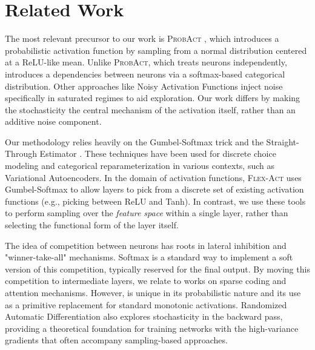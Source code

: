 \section{Related Work}

The most relevant precursor to our work is \textsc{ProbAct} \cite{probact2019}, which introduces a probabilistic activation function by sampling from a normal distribution centered at a ReLU-like mean. Unlike \textsc{ProbAct}, which treats neurons independently, \methodname introduces a dependencies between neurons via a softmax-based categorical distribution. Other approaches like Noisy Activation Functions \cite{noisyact2016} inject noise specifically in saturated regimes to aid exploration. Our work differs by making the stochasticity the central mechanism of the activation itself, rather than an additive noise component.

Our methodology relies heavily on the Gumbel-Softmax trick \cite{gumbel1998} and the Straight-Through Estimator \cite{straightthrough2013}. These techniques have been used for discrete choice modeling and categorical reparameterization in various contexts, such as Variational Autoencoders. In the domain of activation functions, \textsc{Flex-Act} \cite{flexact2026} uses Gumbel-Softmax to allow layers to pick from a discrete set of existing activation functions (e.g., picking between ReLU and Tanh). In contrast, we use these tools to perform sampling over the {\it feature space} within a single layer, rather than selecting the functional form of the layer itself.

The idea of competition between neurons has roots in lateral inhibition and "winner-take-all" mechanisms. Softmax is a standard way to implement a soft version of this competition, typically reserved for the final output. By moving this competition to intermediate layers, we relate to works on sparse coding and attention mechanisms. However, \methodname is unique in its probabilistic nature and its use as a primitive replacement for standard monotonic activations. Randomized Automatic Differentiation \cite{rad2020} also explores stochasticity in the backward pass, providing a theoretical foundation for training networks with the high-variance gradients that often accompany sampling-based approaches.
